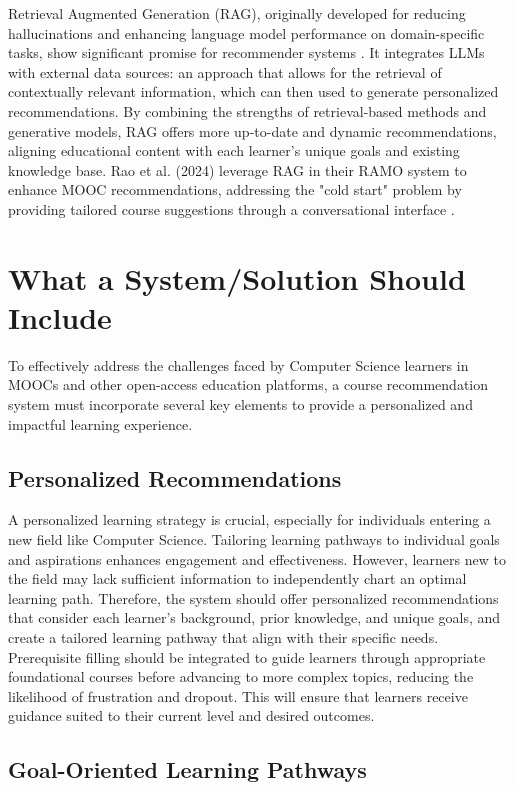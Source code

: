 Retrieval Augmented Generation (RAG), originally developed for reducing hallucinations and enhancing language model performance on domain-specific tasks, show significant promise for recommender systems \cite{noauthor_retrieval-augmented_nodate}. It integrates LLMs with external data sources: an approach that allows for the retrieval of contextually relevant information, which can then used to generate personalized recommendations. By combining the strengths of retrieval-based methods and generative models, RAG offers more up-to-date and dynamic recommendations, aligning educational content with each learner's unique goals and existing knowledge base. Rao et al. (2024) leverage RAG in their RAMO system to enhance MOOC recommendations, addressing the "cold start" problem by providing tailored course suggestions through a conversational interface \cite{rao_ramo_2024}.

\section{What a System/Solution Should Include}

To effectively address the challenges faced by Computer Science learners in MOOCs and other open-access education platforms, a course recommendation system must incorporate several key elements to provide a personalized and impactful learning experience.

\subsection{Personalized Recommendations}

A personalized learning strategy is crucial, especially for individuals entering a new field like Computer Science. Tailoring learning pathways to individual goals and aspirations enhances engagement and effectiveness. However, learners new to the field may lack sufficient information to independently chart an optimal learning path. Therefore, the system should offer personalized recommendations that consider each learner's background, prior knowledge, and unique goals, and create a tailored learning pathway that align with their specific needs. Prerequisite filling should be integrated to guide learners through appropriate foundational courses before advancing to more complex topics, reducing the likelihood of frustration and dropout. This will ensure that learners receive guidance suited to their current level and desired outcomes.


\subsection{Goal-Oriented Learning Pathways}

